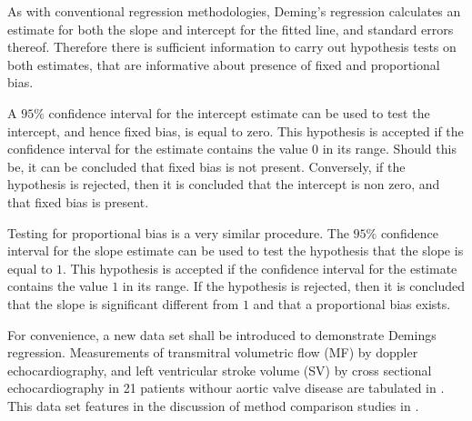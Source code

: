 	
	As with conventional regression methodologies, Deming's regression
	calculates an estimate for both the slope and intercept for the
	fitted line, and standard errors thereof. Therefore there is
	sufficient information to carry out hypothesis tests on both
	estimates, that are informative about presence of fixed and
	proportional bias.
	
	A $95\%$ confidence interval for the intercept estimate can be
	used to test the intercept, and hence fixed bias, is equal to
	zero. This hypothesis is accepted if the confidence interval for
	the estimate contains the value $0$ in its range. Should this be,
	it can be concluded that fixed bias is not present. Conversely, if
	the hypothesis is rejected, then it is concluded that the
	intercept is non zero, and that fixed bias is present.
	
	Testing for proportional bias is a very similar procedure. The
	$95\%$ confidence interval for the slope estimate can be used to
	test the hypothesis that the slope is equal to $1$. This
	hypothesis is accepted if the confidence interval for the estimate
	contains the value $1$ in its range. If the hypothesis is
	rejected, then it is concluded that the slope is significant
	different from $1$ and that a proportional bias exists.
	
	For convenience, a new data set shall be introduced to demonstrate
	Demings regression. Measurements of transmitral volumetric flow
	(MF) by doppler echocardiography, and left ventricular stroke
	volume (SV) by cross sectional echocardiography in 21 patients
	withour aortic valve disease are tabulated in \citet{zhang}. This
	data set features in the discussion of method comparison studies
	in \citet[p.398]{images/AltmanBook} .
	
